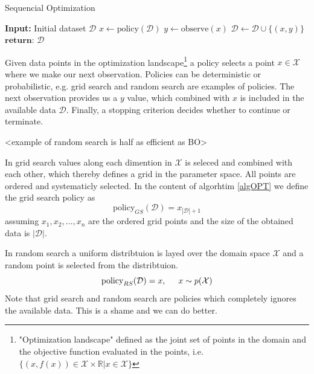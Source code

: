 \begin{algorithm}
\caption{Sequencial Optimization \cite{bayesoptbook} }\label{algOPT}
\begin{algorithmic}
\State \textbf{Input:} Initial dataset $\mathcal{D}$  
    \State $x \gets \text{policy}(\mathcal{D})$ 
    \State $y \gets \text{observe}(x)$ 
    \State $\mathcal{D} \gets \mathcal{D} \cup \{(x,y)\} $ 
\EndWhile
\State $\textbf{return: } \mathcal{D}$
\end{algorithmic}
\end{algorithm}

Given data points in the optimization landscape\footnote{"Optimization landscape" defined as the
joint set of points in the domain and the objective function evaluated in the points, i.e.
$\{(x,f(x))\in \mathcal{X} \times \mathbb{R}| x \in \mathcal{X}\}$} a policy selects a point $x \in
\mathcal{X}$ where we make our next observation. Policies can be deterministic or probabilistic, e.g.
grid search and random search are examples of policies. The next observation provides us a $y$
value, which combined with $x$ is included in the available data $\mathcal{D}$. Finally, a stopping
criterion decides whether to continue or terminate. 

<example of random search is half as efficient as BO>


\begin{testexample}
    In grid search values along each dimention in $\mathcal{X}$ is seleced and combined with each
    other, which thereby defines a grid in the parameter space. All points are ordered and systematicly
    selected. In the content of algorhtim \ref{algOPT} we define the grid search policy as 
    $$\text{policy}_{GS}(\mathcal{D}) = x_{|\mathcal{D}|+1}$$
    assuming $x_1,x_2, \dots, x_{n}$ are the ordered grid points and the size of the obtained 
    data is $|\mathcal{D}|$. 
\end{testexample}
\begin{testexample}
    In random search a uniform distribtuion is layed over the domain space $\mathcal{X}$ and a random point
    is selected from the distribtuion. 
    $$\text{policy}_{RS}(\mathcal{D}) = x, \hspace{0.5cm} x \sim p(\mathcal{X})$$
    Note that grid search and random search are policies which completely 
    ignores the available data. This is a shame and we can do better. 
\end{testexample}

